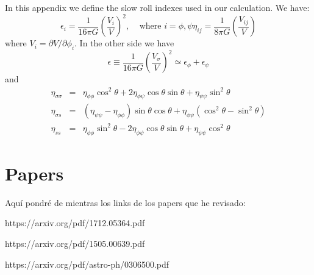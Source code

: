 \documentclass[twocolumn,           %
               showpacs,            %
               preprintnumbers,     %
               aps,                 %
               prl,          	    %
               letterpaper,             %
               superscriptaddress,      %
               nofootinbib,         %
               tightenlines,        %
               floats,floatfix      %
               ,usenatbib,
               ]{revtex4-1}
\begin{document}
In this appendix we define the slow roll indexes used in our calculation. We have:
\begin{subequations}
\begin{equation}
\epsilon_i = \frac{1}{16 \pi G}\left(\frac{V_i}{V}\right)^2, \ \ \ \ \ \text{where $i=\phi,\psi$}
\end{equation}
\begin{equation}
\eta_{ij}=\frac{1}{8\pi G}\left(\frac{V_{ij}}{V}\right)
\end{equation}
\end{subequations}
where $V_i = \partial V/\partial \phi_i$. In the other side we have
\begin{equation}
\epsilon \equiv \frac{1}{16\pi G}\left(\frac{V_\sigma}{V}\right)^2\simeq \epsilon_\phi+\epsilon_\psi
\end{equation}
and
\begin{eqnarray}
\eta_{\sigma\sigma}&=&\eta_{\phi\phi}\cos^2\theta + 2\eta_{\phi\psi}\cos\theta\sin\theta+\eta_{\psi\psi}\sin^2\theta\nonumber \\
\eta_{\sigma s}&=&(\eta_{\psi\psi}-\eta_{\phi\phi})\sin\theta\cos\theta + \eta_{\phi\psi}(\cos^2\theta-\sin^2\theta)\\
\eta_{ss}&=&\eta_{\phi\phi}\sin^2\theta - 2\eta_{\phi\psi}\cos\theta\sin\theta+\eta_{\psi\psi}\cos^2\theta\nonumber 
\end{eqnarray}

\section{Papers}
Aqu\'i pondré de mientras los links de los papers que he revisado:

https://arxiv.org/pdf/1712.05364.pdf

https://arxiv.org/pdf/1505.00639.pdf

https://arxiv.org/pdf/astro-ph/0306500.pdf
\end{document}
